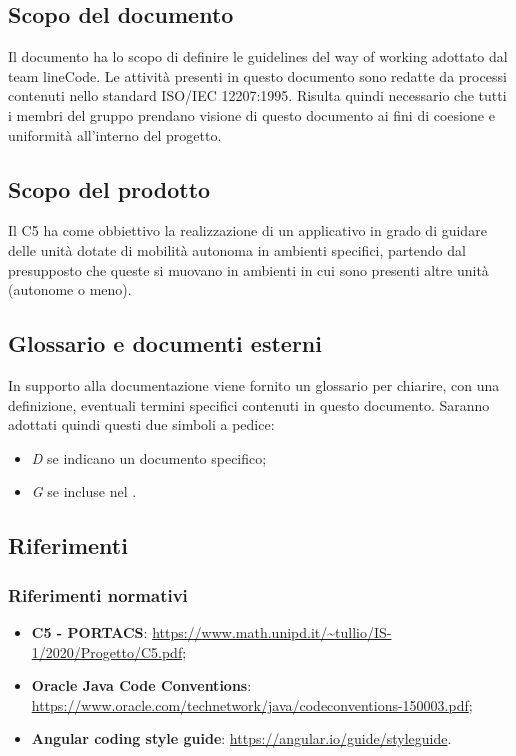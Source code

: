 \subsection{Scopo del documento}
Il documento ha lo scopo di definire le guidelines del way of working adottato dal team lineCode. Le attività presenti in questo documento sono redatte da processi contenuti nello standard ISO/IEC 12207:1995. Risulta quindi necessario che tutti i membri del gruppo prendano visione di questo documento ai fini di coesione e uniformità all'interno del progetto.

\subsection{Scopo del prodotto}
Il  C5 ha come obbiettivo la realizzazione di un applicativo  in grado di guidare delle unità dotate di mobilità autonoma in ambienti specifici, partendo dal presupposto che queste si muovano in ambienti in cui sono presenti altre unità (autonome o meno).

\subsection{Glossario e documenti esterni}
In supporto alla documentazione viene fornito un glossario per chiarire, con una definizione, eventuali termini specifici contenuti in questo documento.
Saranno adottati quindi questi due simboli a pedice:
\begin{itemize}
	\item \textit{D} se indicano un documento specifico;
	\item \textit{G} se incluse nel .
\end{itemize}

\subsection{Riferimenti}
	\subsubsection{Riferimenti normativi}
	\begin{itemize}
		\item \textbf{{C5 - PORTACS}}: \url{https://www.math.unipd.it/~tullio/IS-1/2020/Progetto/C5.pdf};
        \item \textbf{Oracle Java Code Conventions}: \url{https://www.oracle.com/technetwork/java/codeconventions-150003.pdf};
        \item \textbf{Angular coding style guide}: \url{https://angular.io/guide/styleguide}.
	\end{itemize}
